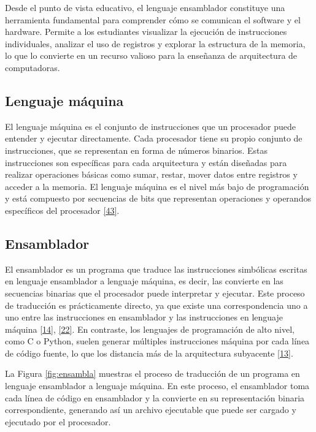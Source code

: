\documentclass[12pt,oneside]{templates/unerthesis}
\begin{document}
Desde el punto de vista educativo, el lenguaje ensamblador constituye una herramienta fundamental para comprender cómo se comunican el software y el hardware. Permite a los estudiantes visualizar la ejecución de instrucciones individuales, analizar el uso de registros y explorar la estructura de la memoria, lo que lo convierte en un recurso valioso para la enseñanza de arquitectura de computadoras.

\hypertarget{lenguaje-muxe1quina}{%
\subsection{Lenguaje máquina}\label{lenguaje-muxe1quina}}

El lenguaje máquina es el conjunto de instrucciones que un procesador puede entender y ejecutar directamente. Cada procesador tiene su propio conjunto de instrucciones, que se representan en forma de números binarios. Estas instrucciones son específicas para cada arquitectura y están diseñadas para realizar operaciones básicas como sumar, restar, mover datos entre registros y acceder a la memoria. El lenguaje máquina es el nivel más bajo de programación y está compuesto por secuencias de bits que representan operaciones y operandos específicos del procesador
\protect\hyperlink{ref-irvine2011assembly}{{[}43{]}}.

\hypertarget{ensamblador}{%
\subsection{Ensamblador}\label{ensamblador}}

El ensamblador es un programa que traduce las instrucciones simbólicas escritas en lenguaje ensamblador a lenguaje máquina, es decir, las convierte en las secuencias binarias que el procesador puede interpretar y ejecutar. Este proceso de traducción es prácticamente directo, ya que existe una correspondencia uno a uno entre las instrucciones en ensamblador y las instrucciones en lenguaje máquina \protect\hyperlink{ref-stallings_computer_2021}{{[}14{]}}, \protect\hyperlink{ref-tanenbaum_structured_2016}{{[}22{]}}. En contraste, los lenguajes de programación de alto nivel, como C o Python, suelen generar múltiples instrucciones máquina por cada línea de código fuente, lo que los distancia más de la arquitectura subyacente \protect\hyperlink{ref-hennessy2017computer}{{[}13{]}}.

La Figura \ref{fig:ensambla} muestras el proceso de traducción de un programa en lenguaje ensamblador a lenguaje máquina. En este proceso, el ensamblador toma cada línea de código en ensamblador y la convierte en su representación binaria correspondiente, generando así un archivo ejecutable que puede ser cargado y ejecutado por el procesador.
\end{document}

